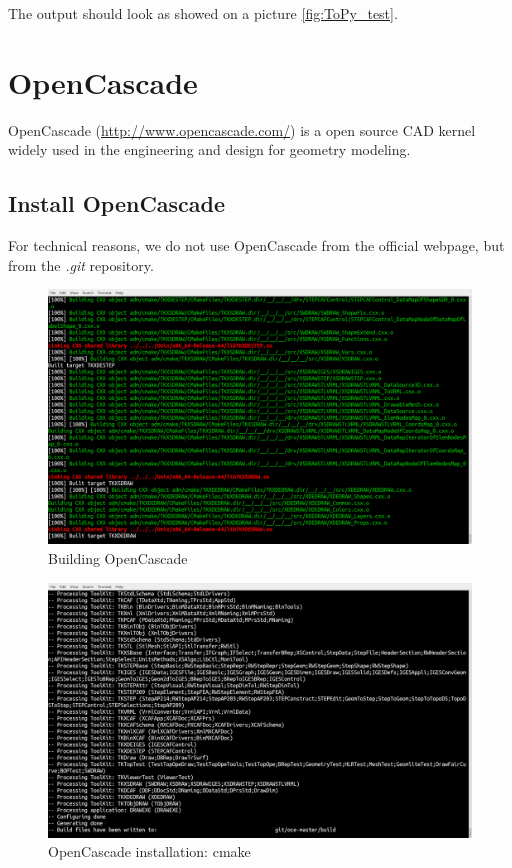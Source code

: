\documentclass[11pt,a4paper,article,bibtotoc,idxtotoc,headsepline,footsepline,footexclude,DIV13,oneside]{scrbook}
\begin{document}
The output should look as showed on a picture \ref{fig:ToPy_test}.


\chapter{OpenCascade}
\label{OpenCascade}
OpenCascade (\href{http://www.opencascade.com/}{http://www.opencascade.com/}) is a open source CAD kernel widely used in the engineering and design for geometry modeling.
\section{Install OpenCascade}
For technical reasons, we do not use OpenCascade from the official webpage, but from the \textit{.git} repository. 
\begin{figure}
\centering
\includegraphics[scale=0.2]{img/OC_Build5.png}
\caption{Building OpenCascade}
\label{fig:OC_build}
\end{figure}
\begin{figure}
\centering
\includegraphics[scale=0.3]{img/OC_CMake2.png}
\caption{OpenCascade installation: cmake}
\label{fig:OC_cmake}
\end{figure}
\end{document}
